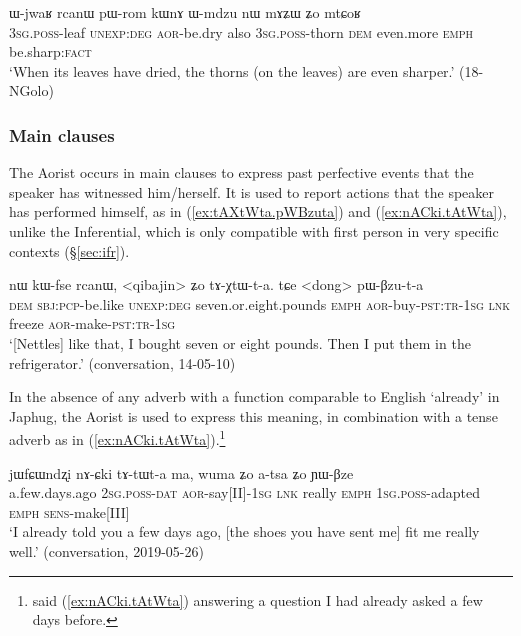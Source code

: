 \begin{exe}
\ex \label{ex:pWrom.kWnA}
 \gll  ɯ-jwaʁ rcanɯ pɯ-rom kɯnɤ ɯ-mdzu nɯ mɤʑɯ ʑo mtɕoʁ \\
\textsc{3sg}.\textsc{poss}-leaf \textsc{unexp}:\textsc{deg} \textsc{aor}-be.dry also \textsc{3sg}.\textsc{poss}-thorn \textsc{dem} even.more \textsc{emph} be.sharp:\textsc{fact} \\
\glt `When its leaves have dried, the thorns (on the leaves) are even sharper.' (18-NGolo)
\end{exe}

\subsubsection{Main clauses}   \label{sec:aor.main}
The Aorist occurs in main clauses to express past perfective events that the speaker has witnessed him/herself. It is used to report actions that the speaker has performed himself, as in (\ref{ex:tAXtWta.pWBzuta}) and (\ref{ex:nACki.tAtWta}), unlike the Inferential, which is only compatible with first person in very specific contexts (§\ref{sec:ifr}).

\begin{exe}
\ex \label{ex:tAXtWta.pWBzuta}
 \gll nɯ kɯ-fse rcanɯ, <qibajin> ʑo tɤ-χtɯ-t-a. tɕe <dong> pɯ-βzu-t-a  \\
\textsc{dem} \textsc{sbj}:\textsc{pcp}-be.like \textsc{unexp}:\textsc{deg} seven.or.eight.pounds \textsc{emph} \textsc{aor}-buy-\textsc{pst}:\textsc{tr}-\textsc{1sg} \textsc{lnk} freeze \textsc{aor}-make-\textsc{pst}:\textsc{tr}-\textsc{1sg} \\
\glt `[Nettles] like that, I bought seven or eight pounds. Then I put them in the refrigerator.' (conversation, 14-05-10)
\end{exe}

In the absence of any adverb with a function comparable to English `already' in Japhug, the Aorist is used to express this meaning, in combination with a tense adverb as in (\ref{ex:nACki.tAtWta}).\footnote{ said (\ref{ex:nACki.tAtWta}) answering a question I had already asked a few days before. }

\begin{exe}
\ex \label{ex:nACki.tAtWta}
 \gll jɯfɕɯndʐi nɤ-ɕki tɤ-tɯt-a ma, wuma ʑo a-tsa ʑo ɲɯ-βze  \\
 a.few.days.ago \textsc{2sg}.\textsc{poss}-\textsc{dat} \textsc{aor}-say[II]-\textsc{1sg} \textsc{lnk} really \textsc{emph} \textsc{1sg}.\textsc{poss}-adapted \textsc{emph} \textsc{sens}-make[III] \\
 \glt `I already told you a few days ago, [the shoes you have sent me] fit me really well.' (conversation, 2019-05-26)
\end{exe}


